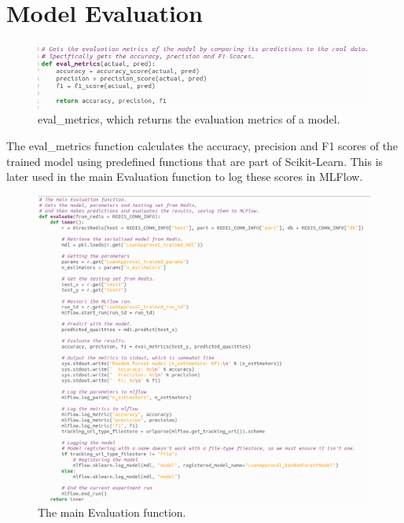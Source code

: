 \documentclass[12pt]{report}
\newcommand{\para}{\vspace{7pt}\noindent}
\begin{document}
\section{Model Evaluation}\label{sec:ImpEvaluation}

\begin{figure}[H]
    \centering
    \includegraphics[width=\linewidth]{Implementation/.Code/PipelineFunctions/Evaluation1.png}
    \caption{eval\_metrics, which returns the evaluation metrics of a model.}
    \label{fig:Evaluation1}
\end{figure}

\para The eval\_metrics function calculates the accuracy, precision and F1 scores of the trained model 
using predefined functions that are part of Scikit-Learn. This is later used in the main Evaluation function 
to log these scores in MLFlow.

\begin{figure}[H]
    \centering
    \includegraphics[width=\linewidth]{Implementation/.Code/PipelineFunctions/Evaluation2.png}
    \caption{The main Evaluation function.}
    \label{fig:Evaluation2}
\end{figure}
\end{document}
